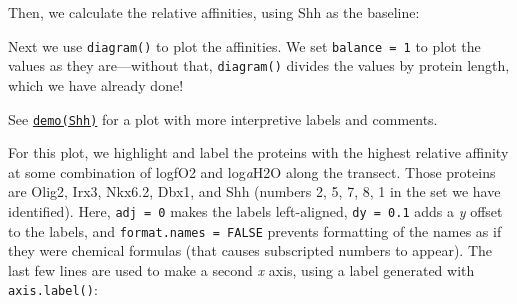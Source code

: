 \documentclass[]{tufte-handout}
\newenvironment{Shaded}{}{}
\newcommand{\KeywordTok}[1]{\textcolor[rgb]{0.00,0.44,0.13}{\textbf{#1}}}
\newcommand{\DecValTok}[1]{\textcolor[rgb]{0.25,0.63,0.44}{#1}}
\newcommand{\StringTok}[1]{\textcolor[rgb]{0.25,0.44,0.63}{#1}}
\newcommand{\ControlFlowTok}[1]{\textcolor[rgb]{0.00,0.44,0.13}{\textbf{#1}}}
\newcommand{\OperatorTok}[1]{\textcolor[rgb]{0.40,0.40,0.40}{#1}}
\newcommand{\NormalTok}[1]{#1}
\begin{document}
\begin{Shaded}
\end{Shaded}

Then, we calculate the relative affinities, using Shh as the baseline:

\begin{Shaded}
\end{Shaded}

Next we use {\texttt{diagram()}} to plot the affinities. We set
\texttt{balance\ =\ 1} to plot the values as they are---without that,
{\texttt{diagram()}} divides the values by protein length, which we have
already done!

\begin{marginfigure}
See \href{../demo}{{\texttt{demo(Shh)}}} for a plot with more
interpretive labels and comments.
\end{marginfigure}

For this plot, we highlight and label the proteins with the highest
relative affinity at some combination of logfO2 and log\emph{a}H2O along
the transect. Those proteins are Olig2, Irx3, Nkx6.2, Dbx1, and Shh
(numbers 2, 5, 7, 8, 1 in the set we have identified). Here,
\texttt{adj\ =\ 0} makes the labels left-aligned, \texttt{dy\ =\ 0.1}
adds a \emph{y} offset to the labels, and
\texttt{format.names\ =\ FALSE} prevents formatting of the names as if
they were chemical formulas (that causes subscripted numbers to appear).
The last few lines are used to make a second \emph{x} axis, using a
label generated with {\texttt{axis.label()}}:
\end{document}

